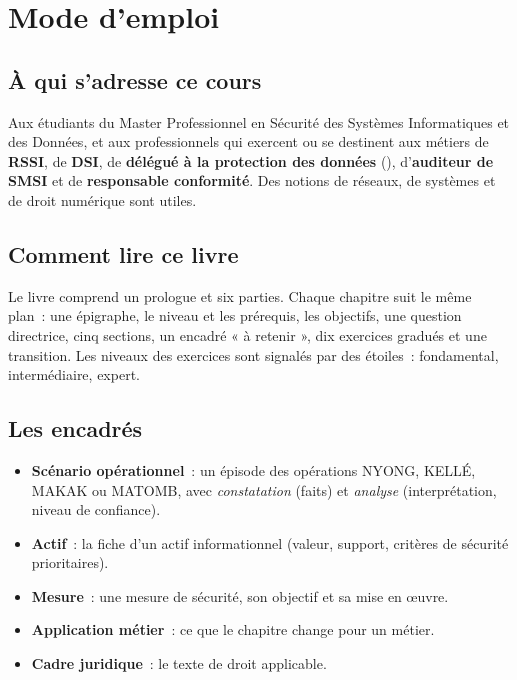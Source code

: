 
\chapter*{Mode d'emploi}

\section*{À qui s'adresse ce cours}

Aux étudiants du Master Professionnel en Sécurité des Systèmes Informatiques
et des Données, et aux professionnels qui exercent ou se destinent aux
métiers de \textbf{RSSI}, de \textbf{DSI}, de \textbf{délégué à la protection
des données} (), d'\textbf{auditeur de SMSI} et de
\textbf{responsable conformité}. Des notions de réseaux, de systèmes et de
droit numérique sont utiles.

\section*{Comment lire ce livre}

Le livre comprend un prologue et six parties. Chaque chapitre suit le même
plan~: une épigraphe, le niveau et les prérequis, les objectifs, une question
directrice, cinq sections, un encadré « à retenir », dix exercices gradués et
une transition. Les niveaux des exercices sont signalés par des étoiles~:
\niveaubase{} fondamental, \niveaumoyen{} intermédiaire, \niveauexpert{}
expert.

\section*{Les encadrés}

\begin{itemize}
    \item \textbf{Scénario opérationnel}~: un épisode des opérations NYONG,
          KELLÉ, MAKAK ou MATOMB, avec \emph{constatation} (faits) et
          \emph{analyse} (interprétation, niveau de confiance).
    \item \textbf{Actif}~: la fiche d'un actif informationnel (valeur, support,
          critères de sécurité prioritaires).
    \item \textbf{Mesure}~: une mesure de sécurité, son objectif et sa mise en
          \oe uvre.
    \item \textbf{Application métier}~: ce que le chapitre change pour un
          métier.
    \item \textbf{Cadre juridique}~: le texte de droit applicable.
\end{itemize}

